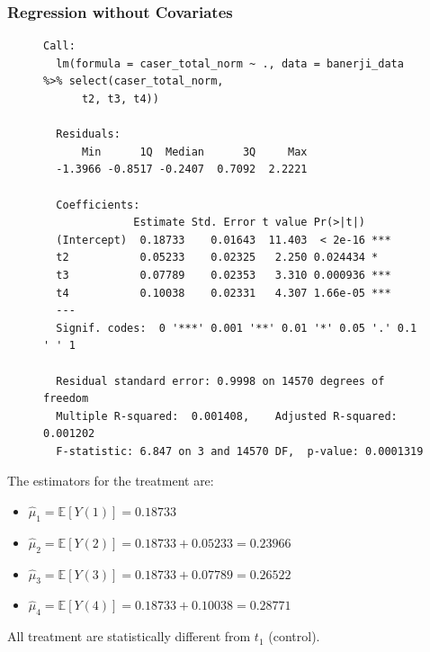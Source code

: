 \documentclass{article}
\begin{document}
\subsubsection*{Regression without Covariates}
\begin{figure}[H]
\begin{lstlisting}[style=RstyleComment, caption=Regression without Covariates]
  Call:
  lm(formula = caser_total_norm ~ ., data = banerji_data %>% select(caser_total_norm, 
      t2, t3, t4))
  
  Residuals:
      Min      1Q  Median      3Q     Max 
  -1.3966 -0.8517 -0.2407  0.7092  2.2221 
  
  Coefficients:
              Estimate Std. Error t value Pr(>|t|)    
  (Intercept)  0.18733    0.01643  11.403  < 2e-16 ***
  t2           0.05233    0.02325   2.250 0.024434 *  
  t3           0.07789    0.02353   3.310 0.000936 ***
  t4           0.10038    0.02331   4.307 1.66e-05 ***
  ---
  Signif. codes:  0 '***' 0.001 '**' 0.01 '*' 0.05 '.' 0.1 ' ' 1
  
  Residual standard error: 0.9998 on 14570 degrees of freedom
  Multiple R-squared:  0.001408,	Adjusted R-squared:  0.001202 
  F-statistic: 6.847 on 3 and 14570 DF,  p-value: 0.0001319
\end{lstlisting}
\end{figure}

The estimators for the treatment are:
\begin{itemize}
  \item $\hat{\mu}_1 = \mathbb{E}[Y(1)] = 0.18733$
  \item $\hat{\mu}_2 = \mathbb{E}[Y(2)] = 0.18733 + 0.05233 = 0.23966$
  \item $\hat{\mu}_3 = \mathbb{E}[Y(3)] = 0.18733 + 0.07789 = 0.26522$
  \item $\hat{\mu}_4 = \mathbb{E}[Y(4)] = 0.18733 + 0.10038 = 0.28771$
\end{itemize}

All treatment are statistically different from $t_1$ (control).
\end{document}
